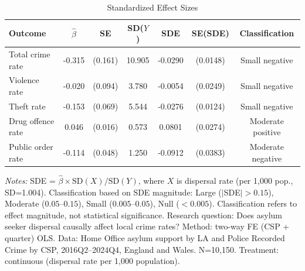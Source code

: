 \begin{table}[t]
\centering
\caption{Standardized Effect Sizes}
\label{tab:sde}
\small
\begin{tabular}{lcccccc}
\hline\hline
Outcome & $\hat{\beta}$ & SE & SD($Y$) & SDE & SE(SDE) & Classification \\
\hline
Total crime rate & -0.315 & (0.161) & 10.905 & -0.0290 & (0.0148) & Small negative \\
Violence rate & -0.020 & (0.094) & 3.780 & -0.0054 & (0.0249) & Small negative \\
Theft rate & -0.153 & (0.069) & 5.544 & -0.0276 & (0.0124) & Small negative \\
Drug offence rate & 0.046 & (0.016) & 0.573 & 0.0801 & (0.0274) & Moderate positive \\
Public order rate & -0.114 & (0.048) & 1.250 & -0.0912 & (0.0383) & Moderate negative \\
\hline\hline
\end{tabular}
\begin{tablenotes}\small
\item \textit{Notes:} SDE = $\hat{\beta} \times \text{SD}(X) / \text{SD}(Y)$, where $X$ is dispersal rate (per 1,000 pop., SD=1.004). Classification based on SDE magnitude: Large ($|$SDE$|>0.15$), Moderate ($0.05$--$0.15$), Small ($0.005$--$0.05$), Null ($<0.005$). Classification refers to effect magnitude, not statistical significance. Research question: Does asylum seeker dispersal causally affect local crime rates? Method: two-way FE (CSP + quarter) OLS. Data: Home Office asylum support by LA and Police Recorded Crime by CSP, 2016Q2--2024Q4, England and Wales. N=10,150. Treatment: continuous (dispersal rate per 1,000 population).
\end{tablenotes}
\end{table}
